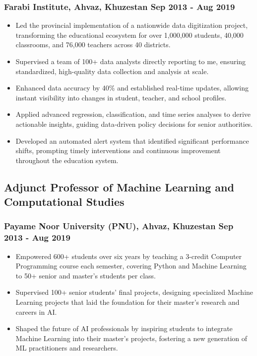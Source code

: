 \documentclass[11pt]{article} %
\begin{document}
\subsubsection{Farabi Institute, Ahvaz, Khuzestan \hfill Sep 2013 - Aug 2019}
\begin{itemize}[itemsep=5pt]
	\item Led the provincial implementation of a nationwide data digitization project, transforming the educational ecosystem for over 1,000,000 students, 40,000 classrooms, and 76,000 teachers across 40 districts.
	\item Supervised a team of 100+ data analysts directly reporting to me, ensuring standardized, high-quality data collection and analysis at scale. 
	\item Enhanced data accuracy by 40\% and established real-time updates, allowing instant visibility into changes in student, teacher, and school profiles.
	\item Applied advanced regression, classification, and time series analyses to derive actionable insights, guiding data-driven policy decisions for senior authorities.
	\item Developed an automated alert system that identified significant performance shifts, prompting timely interventions and continuous improvement throughout the education system.
\end{itemize}

\subsection{Adjunct Professor of Machine Learning and Computational Studies}
\subsubsection{Payame Noor University (PNU), Ahvaz, Khuzestan \hfill Sep 2013 - Aug 2019}
\begin{itemize}[itemsep=5pt]
	\item Empowered 600+ students over six years by teaching a 3-credit Computer Programming course each semester, covering Python and Machine Learning to 50+ senior and master's students per class.
	\item Supervised 100+ senior students' final projects, designing specialized Machine Learning projects that laid the foundation for their master's research and careers in AI.
	\item Shaped the future of AI professionals by inspiring students to integrate Machine Learning into their master's projects, fostering a new generation of ML practitioners and researchers.
\end{itemize}
\end{document}
